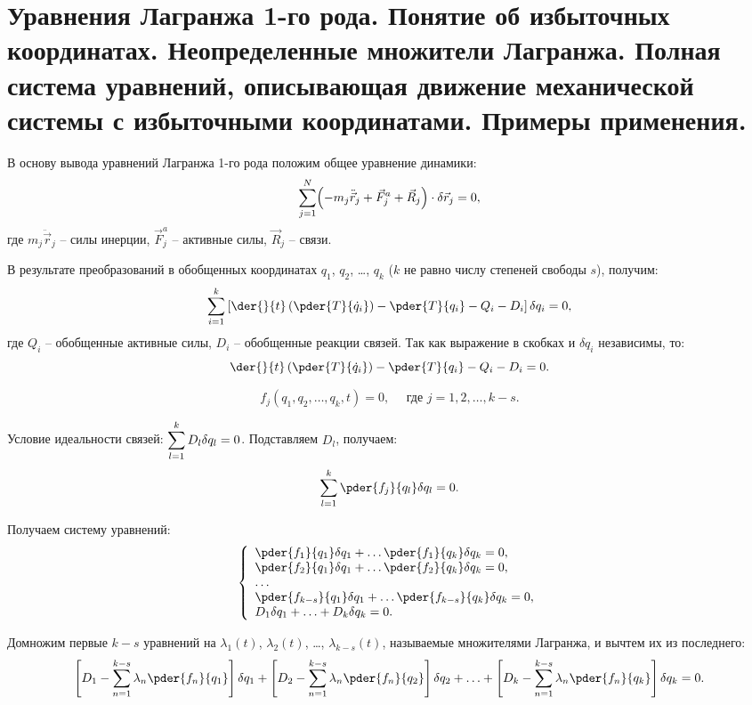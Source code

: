 \chapter{Уравнения Лагранжа 1-го рода. Понятие об избыточных координатах.
Неопределенные множители Лагранжа. Полная система уравнений, описывающая
движение механической системы с избыточными координатами. Примеры применения.}

В основу вывода уравнений Лагранжа 1-го рода положим общее уравнение динамики:
\[
    \sum\limits_{j=1}^N \Bigl(-m_j\ddot{\vec{r}}_j + \vec{F}^a_j + \vec{R}_j
    \Bigr)\cdot\delta\vec{r}_j = 0,
\]
где \( m_j\ddot{\vec{r}}_j \) -- силы инерции, \( \vec{F}^a_j \) -- активные
силы, \( \vec{R}_j \) -- связи.


В результате преобразований в обобщенных координатах \( q_1 \), \( q_2 \),
\ldots, \( q_k \) (\( k \) не равно числу степеней свободы \( s \)), получим:
\[
    \sum\limits_{i=1}^k \left[\der{}{t}\left(\pder{T}{\dot{q}_i}\right) -
    \pder{T}{q_i} - Q_i - D_i\right]\delta q_i = 0,
\]
где \( Q_i \) -- обобщенные активные силы, \( D_i \) -- обобщенные реакции
связей. Так как выражение в скобках и \( \delta q_i \) независимы, то:
\[
    \der{}{t}\left(\pder{T}{\dot{q}_i}\right) - \pder{T}{q_i} - Q_i - D_i = 0.
\]


\[
    f_j(q_1, q_2, \ldots, q_k, t) = 0, \quad \text{ где } j = 1, 2, \ldots, k-s.
\]

Условие идеальности связей: \( \displaystyle \sum_{l=1}^k D_l\delta q_l = 0 \).
Подставляем \( D_l \), получаем:
\[
    \sum\limits_{l=1}^k \pder{f_j}{q_l}\delta q_l = 0.
\]

Получаем систему уравнений:
\[
    \left\{ \begin{array}{l}
       \ds \pder{f_1}{q_1}\delta q_1 + \ldots \pder{f_1}{q_k}\delta q_k = 0, \\
       \ds \pder{f_2}{q_1}\delta q_1 + \ldots \pder{f_2}{q_k}\delta q_k = 0, \\
       \ldots \\
       \ds \pder{f_{k-s}}{q_1}\delta q_1 + \ldots \pder{f_{k-s}}{q_k}\delta
       q_k = 0, \\
       D_1\delta q_1 + \ldots + D_k \delta q_k = 0.
    \end{array} \right.
\]

Домножим первые \( k - s \) уравнений на \( \lambda_1(t) \), \( \lambda_2(t) \),
\ldots, \( \lambda_{k-s}(t) \), называемые множителями Лагранжа, и вычтем их из
последнего:
\[
    \left[D_1 - \sum_{n=1}^{k-s}\lambda_n\pder{f_n}{q_1}\right]\delta q_1 +
    \left[D_2 - \sum_{n=1}^{k-s}\lambda_n\pder{f_n}{q_2}\right]\delta q_2 +
    \ldots +
    \left[D_k - \sum_{n=1}^{k-s}\lambda_n\pder{f_n}{q_k}\right]\delta q_k = 0.
\]

